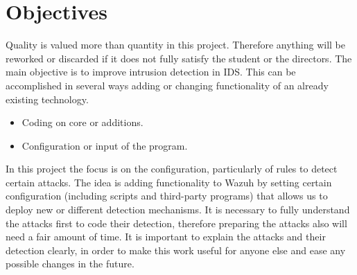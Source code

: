 \section{Objectives}
Quality is valued more than quantity in this project. Therefore anything will be reworked or discarded if it does not fully satisfy the student or the directors.
\linej
\linej
The main objective is to improve intrusion detection in IDS. This can be accomplished in several ways adding or changing functionality of an already existing technology.
\begin{itemize}
	\item Coding on core or additions.
	\item Configuration or input of the program.
\end{itemize}
\linej
In this project the focus is on the configuration, particularly of rules to detect certain attacks.
The idea is adding functionality to Wazuh by setting certain configuration (including scripts and third-party programs) that allows us to deploy new or different detection mechanisms.
\linej
It is necessary to fully understand the attacks first to code their detection, therefore preparing the attacks also will need a fair amount of time.
It is important to explain the attacks and their detection clearly, in order to make this work useful for anyone else and ease any possible changes in the future.

